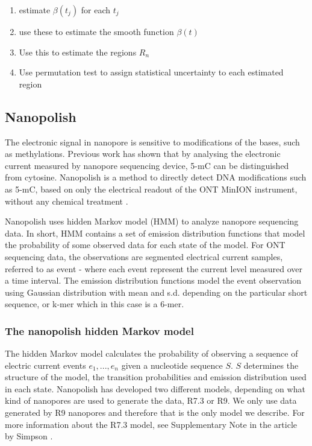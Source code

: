 \begin{enumerate}
    \item estimate $\beta(t_j)$ for each $t_j$
    \item use these to estimate the smooth function $\beta(t)$
    \item Use this to estimate the regions $R_n$
    \item Use permutation test to assign statistical uncertainty to each estimated region \cite{jaffe2012bump}
\end{enumerate}

\subsection{Nanopolish}
\label{sec:background:nanopolish}
The electronic signal in nanopore is sensitive to modifications of the bases, such as methylations. Previous work has shown that by analysing the electronic current measured by nanopore sequencing device, 5-mC can be distinguished from cytosine. Nanopolish is a method to directly detect DNA modifications such as 5-mC, based on only the electrical readout of the ONT MinION instrument, without any chemical treatment \cite{simpson2017detecting}.

Nanopolish uses hidden Markov model (HMM) to analyze nanopore sequencing data. In short, HMM contains a set of emission distribution functions that model the probability of some observed data for each state of the model. For ONT sequencing data, the observations are segmented electrical current samples, referred to as event - where each event represent the current level measured over a time interval. The emission distribution functions model the event observation using Gaussian distribution with mean and s.d. depending on the particular short sequence, or k-mer which in this case is a 6-mer.

\subsubsection{The nanopolish hidden Markov model}
The hidden Markov model calculates the probability of observing a sequence of electric current events $e_1,...,e_n$ given a nucleotide sequence $S$. $S$ determines the structure of the model, the transition probabilities and emission distribution used in each state. Nanopolish has developed two different models, depending on what kind of nanopores are used to generate the data, R7.3 or R9. We only use data generated by R9 nanopores and therefore that is the only model we describe. For more information about the R7.3 model, see Supplementary Note in the article by Simpson \cite{simpson2017detecting}.


